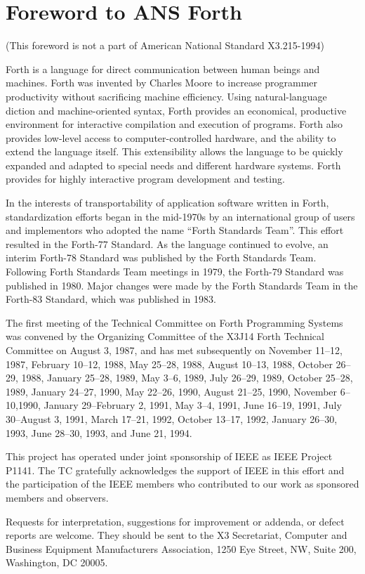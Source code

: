 
\vspace*{-6ex}\chapter*{Foreword to ANS Forth}

(This foreword is not a part of American National Standard X3.215-1994)

Forth is a language for direct communication between human beings and
machines. Forth was invented by Charles Moore to increase programmer
productivity without sacrificing machine efficiency.
Using natural-language diction and machine-oriented syntax,
Forth provides an economical, productive environment for interactive
compilation and execution of programs. Forth also provides low-level
access to computer-controlled hardware, and the ability to extend the
language itself. This extensibility allows the language to be quickly
expanded and adapted to special needs and different hardware systems.
Forth provides for highly interactive program development and testing.

In the interests of transportability of application software written in
Forth, standardization efforts began in the mid-1970s by an international
group of users and implementors who adopted the name ``Forth Standards Team''.
This effort resulted in the Forth-77 Standard. As the language continued
to evolve, an interim Forth-78 Standard was published by the Forth Standards
Team. Following Forth Standards Team meetings in 1979, the Forth-79 Standard
was published in 1980. Major changes were made by the Forth Standards Team
in the Forth-83 Standard, which was published in 1983.

The first meeting of the Technical Committee on Forth Programming Systems
was convened by the Organizing Committee of the X3J14 Forth Technical
Committee on August 3, 1987, and has met subsequently on
November 11--12, 1987,
February 10--12, 1988,
May 25--28, 1988,
August 10--13, 1988,
October 26--29, 1988,
January 25--28, 1989,
May 3--6, 1989,
July 26--29, 1989,
October 25--28, 1989,
January 24--27, 1990,
May 22--26, 1990,
August 21--25, 1990,
November 6--10,1990,
January 29--February 2, 1991,
May 3--4, 1991,
June 16--19, 1991,
July 30--August 3, 1991,
March 17--21, 1992,
October 13--17, 1992,
January 26--30, 1993,
June 28--30, 1993,
and
June 21, 1994.

This project has operated under joint sponsorship of IEEE as IEEE Project P1141.
The TC gratefully acknowledges the support of IEEE in this effort and the
participation of the IEEE members who contributed to our work as sponsored
members and observers.

Requests for interpretation, suggestions for improvement or addenda, or defect
reports are welcome. They should be sent to the X3 Secretariat, Computer and
Business Equipment Manufacturers Association, 1250 Eye Street, NW, Suite 200,
Washington, DC 20005.
